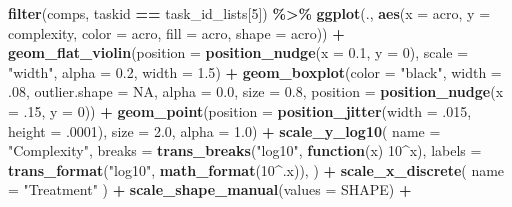 \documentclass[
]{book}
\newenvironment{Shaded}{\begin{snugshade}}{\end{snugshade}}
\newcommand{\AttributeTok}[1]{\textcolor[rgb]{0.13,0.29,0.53}{#1}}
\newcommand{\ConstantTok}[1]{\textcolor[rgb]{0.56,0.35,0.01}{#1}}
\newcommand{\ControlFlowTok}[1]{\textcolor[rgb]{0.13,0.29,0.53}{\textbf{#1}}}
\newcommand{\DecValTok}[1]{\textcolor[rgb]{0.00,0.00,0.81}{#1}}
\newcommand{\FloatTok}[1]{\textcolor[rgb]{0.00,0.00,0.81}{#1}}
\newcommand{\FunctionTok}[1]{\textcolor[rgb]{0.13,0.29,0.53}{\textbf{#1}}}
\newcommand{\NormalTok}[1]{#1}
\newcommand{\SpecialCharTok}[1]{\textcolor[rgb]{0.81,0.36,0.00}{\textbf{#1}}}
\newcommand{\StringTok}[1]{\textcolor[rgb]{0.31,0.60,0.02}{#1}}
\begin{document}
\begin{Shaded}
\begin{Highlighting}[]
\FunctionTok{filter}\NormalTok{(comps, taskid }\SpecialCharTok{==}\NormalTok{ task\_id\_lists[}\DecValTok{5}\NormalTok{]) }\SpecialCharTok{\%\textgreater{}\%}
  \FunctionTok{ggplot}\NormalTok{(., }\FunctionTok{aes}\NormalTok{(}\AttributeTok{x =}\NormalTok{ acro, }\AttributeTok{y =}\NormalTok{ complexity, }\AttributeTok{color =}\NormalTok{ acro,}
                \AttributeTok{fill =}\NormalTok{ acro, }\AttributeTok{shape =}\NormalTok{ acro)) }\SpecialCharTok{+}
  \FunctionTok{geom\_flat\_violin}\NormalTok{(}\AttributeTok{position =} \FunctionTok{position\_nudge}\NormalTok{(}\AttributeTok{x =} \FloatTok{0.1}\NormalTok{, }\AttributeTok{y =} \DecValTok{0}\NormalTok{),}
                   \AttributeTok{scale =} \StringTok{"width"}\NormalTok{, }\AttributeTok{alpha =} \FloatTok{0.2}\NormalTok{, }\AttributeTok{width =} \FloatTok{1.5}\NormalTok{) }\SpecialCharTok{+}
  \FunctionTok{geom\_boxplot}\NormalTok{(}\AttributeTok{color =} \StringTok{"black"}\NormalTok{, }\AttributeTok{width =}\NormalTok{ .}\DecValTok{08}\NormalTok{, }\AttributeTok{outlier.shape =} \ConstantTok{NA}\NormalTok{, }\AttributeTok{alpha =} \FloatTok{0.0}\NormalTok{,}
               \AttributeTok{size =} \FloatTok{0.8}\NormalTok{, }\AttributeTok{position =} \FunctionTok{position\_nudge}\NormalTok{(}\AttributeTok{x =}\NormalTok{ .}\DecValTok{15}\NormalTok{, }\AttributeTok{y =} \DecValTok{0}\NormalTok{)) }\SpecialCharTok{+}
  \FunctionTok{geom\_point}\NormalTok{(}\AttributeTok{position =} \FunctionTok{position\_jitter}\NormalTok{(}\AttributeTok{width =}\NormalTok{ .}\DecValTok{015}\NormalTok{, }\AttributeTok{height =}\NormalTok{ .}\DecValTok{0001}\NormalTok{),}
             \AttributeTok{size =} \FloatTok{2.0}\NormalTok{, }\AttributeTok{alpha =} \FloatTok{1.0}\NormalTok{) }\SpecialCharTok{+}
  \FunctionTok{scale\_y\_log10}\NormalTok{(}
    \AttributeTok{name =} \StringTok{"Complexity"}\NormalTok{,}
    \AttributeTok{breaks =} \FunctionTok{trans\_breaks}\NormalTok{(}\StringTok{"log10"}\NormalTok{, }\ControlFlowTok{function}\NormalTok{(x) }\DecValTok{10}\SpecialCharTok{\^{}}\NormalTok{x),}
    \AttributeTok{labels =} \FunctionTok{trans\_format}\NormalTok{(}\StringTok{"log10"}\NormalTok{, }\FunctionTok{math\_format}\NormalTok{(}\DecValTok{10}\SpecialCharTok{\^{}}\NormalTok{.x)),}
\NormalTok{  ) }\SpecialCharTok{+}
  \FunctionTok{scale\_x\_discrete}\NormalTok{(}
    \AttributeTok{name =} \StringTok{"Treatment"}
\NormalTok{  ) }\SpecialCharTok{+}
  \FunctionTok{scale\_shape\_manual}\NormalTok{(}\AttributeTok{values =}\NormalTok{ SHAPE) }\SpecialCharTok{+}

\end{Highlighting}
\end{Shaded}
\end{document}
